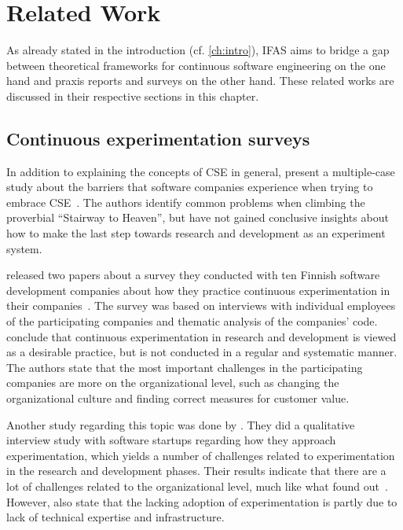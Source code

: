 %
\chapter{Related Work}
\label{ch:related-work}

As already stated in the introduction (cf. \cref{ch:intro}), \acf{IFAS} aims to bridge a gap between theoretical frameworks for continuous software engineering on the one hand and praxis reports and surveys on the other hand.
These related works are discussed in their respective sections in this chapter.

\section{Continuous experimentation surveys}
\label{sec:related:surveys}

In addition to explaining the concepts of \ac{CSE} in general, \citeauthor{Olsson2012} present a multiple-case study about the barriers that software companies experience when trying to embrace \ac{CSE}~\cite{Olsson2012}.
The authors identify common problems when climbing the proverbial ``Stairway to Heaven'', but have not gained conclusive insights about how to make the last step towards research and development as an experiment system.

\citeauthor{Lindgren2015} released two papers about a survey they conducted with ten Finnish software development companies about how they practice continuous experimentation in their companies~\cite{Lindgren2015,lindgren2015software}.
The survey was based on interviews with individual employees of the participating companies and thematic analysis of the companies' code.
\citeauthor{Lindgren2015} conclude that continuous experimentation in research and development is viewed as a desirable practice, but is not conducted in a regular and systematic manner.
The authors state that the most important challenges in the participating companies are more on the organizational level, such as changing the organizational culture and finding correct measures for customer value.

Another study regarding this topic was done by \citet{gutbrod2017software}.
They did a qualitative interview study with software startups regarding how they approach experimentation, which yields a number of challenges related to experimentation in the research and development phases.
Their results indicate that there are a lot of challenges related to the organizational level, much like what \citeauthor{Lindgren2015} found out~\cite{Lindgren2015}.
However, \citeauthor{gutbrod2017software} also state that the lacking adoption of experimentation is partly due to lack of technical expertise and infrastructure.


